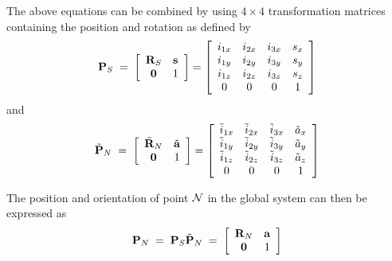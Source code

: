 The above equations can be combined by using $4\times4$ transformation matrices
containing the position and rotation as defined by 
%
\begin{equation}
{\bf P}_S \;=\;
\left[\begin{array}{cc} {\bf R}_S & {\bf s}\\ {\bf 0} & 1 \end{array}\right] =
\left[\begin{array}{cccc}
i_{1x} & i_{2x} & i_{3x} & s_x \\
i_{1y} & i_{2y} & i_{3y} & s_y \\
i_{1z} & i_{2z} & i_{3z} & s_z \\
0 & 0 & 0 & 1
\end{array}\right]
\label{eq:posDef}
\end{equation}
%
and
%
\begin{equation}
\tilde{\bf P}_N \;=\;
\left[\begin{array}{cc}
\tilde{\bf R}_N & \tilde{\bf a} \\
{\bf 0} & 1 \end{array}
\right] = \left[\begin{array}{cccc}
\tilde{i}_{1x} & \tilde{i}_{2x} & \tilde{i}_{3x} & \tilde{a}_x \\
\tilde{i}_{1y} & \tilde{i}_{2y} & \tilde{i}_{3y} & \tilde{a}_y \\
\tilde{i}_{1z} & \tilde{i}_{2z} & \tilde{i}_{3z} & \tilde{a}_z \\
0 & 0 & 0 & 1
\end{array}\right]
\end{equation}

The position and orientation of point $\cal N$ in the global system
can then be expressed as
%
\begin{equation}
{\bf P}_N \;=\; {\bf P}_S\tilde{\bf P}_N \;=\;
\left[\begin{array}{cc} {\bf R}_N & {\bf a} \\ {\bf 0} & 1 \end{array}\right]
\label{eq:posUpdate}
\end{equation}
%

